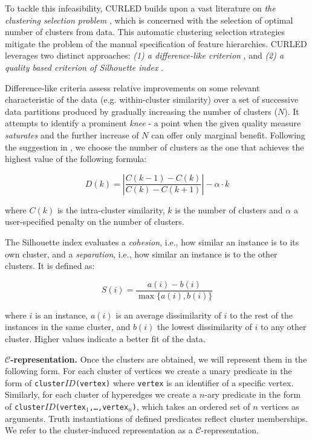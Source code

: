 To tackle this infeasibility, CURLED builds upon a vast literature on \textit{the clustering selection problem} \cite{Arbelaitz:2013}, which is concerned with the selection of optimal number of clusters from data.
This automatic clustering selection strategies mitigate the problem of the manual specification of feature hierarchies.
CURLED leverages  two distinct approaches: \textit{(1) a difference-like criterion} \cite{Vendramin:2010}, and \textit{(2) a quality based criterion of Silhouette index} \cite{Rousseeuw:1987}.


Difference-like criteria assess relative improvements on some relevant characteristic of the data (e.g. within-cluster similarity) over a set of successive data partitions produced by gradually increasing the number of clusters ($N$).
It attempts to identify a prominent \textit{knee} - a point when the given quality measure \textit{saturates} and the further increase of $N$ can offer only marginal benefit.
Following the suggestion in \cite{Vendramin:2010}, we choose the number of clusters as the one that achieves the highest value of the following formula:

\begin{equation}
	D(k) = \left| \frac{C(k-1) - C(k)}{C(k) - C(k+1)} \right| - \alpha \cdot k
	\label{eq:Sat}
\end{equation}

where $C(k)$ is the intra-cluster similarity, $k$ is the number of clusters and $\alpha$ a user-specified penalty on the number of clusters.


The Silhouette index evaluates a \textit{cohesion}, i.e., how similar an instance is to its own cluster, and a \textit{separation}, i.e., how similar an instance is to the other clusters.
It is defined as:

\begin{equation}
    S(i) = \frac{a(i) - b(i)}{ \max \{ a(i), b(i)\}}
\end{equation}

where $i$ is an instance, $a(i)$ is an average dissimilarity of $i$ to the rest of the instances in the same cluster, and $b(i)$ the lowest dissimilarity of $i$ to any other cluster. 
Higher values indicate a better fit of the data.


\textbf{$\mathcal{C}$-representation.} 
Once the clusters are obtained, we will represent them in the following form.
For each cluster of vertices we create a unary predicate in the form of \texttt{cluster$ID$(vertex)} where {\tt vertex} is an identifier of a specific vertex.
Similarly, for each cluster of hyperedges we create a $n$-ary predicate in the form of \texttt{cluster$ID$(vertex$_1$,\ldots,vertex$_n$)}, which takes an ordered set of $n$ vertices as arguments.
Truth instantiations of defined predicates reflect cluster memberships.
We refer to the cluster-induced representation as a $\mathcal{C}$-representation.

